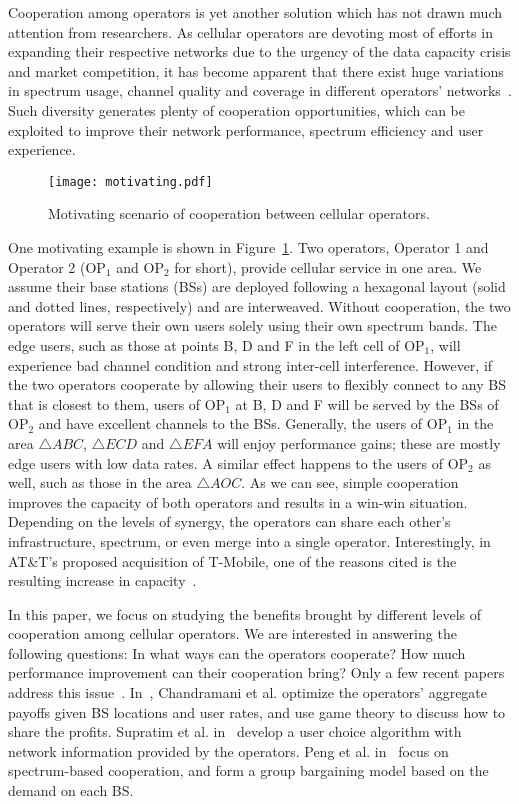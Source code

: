 \documentclass[conference]{IEEEtran}
\begin{document}
Cooperation among operators is yet another solution which has not drawn much attention from researchers. As cellular operators are devoting most of efforts in expanding their respective networks due to the urgency of the data capacity crisis and market competition, it has become apparent that there exist huge variations in spectrum usage, channel quality and coverage in different operators' networks~\cite{CoverageData}. Such diversity generates plenty of cooperation opportunities, which can be exploited to improve their network performance, spectrum efficiency and user experience.

\begin{figure}[htbp]
    \centerline{\texttt{[image: motivating.pdf]}}
    \caption{
       Motivating scenario of cooperation between cellular operators.
    }
    \label{fig:motivatingexample}
\vspace{-0.25in}
\end{figure}
One motivating example is shown in Figure~\ref{fig:motivatingexample}. Two operators, Operator 1 and Operator 2 (OP$_1$ and OP$_2$ for short), provide cellular service in one area. We assume their base stations (BSs) are deployed following a hexagonal layout (solid and dotted lines, respectively) and are interweaved. Without cooperation, the two operators will serve their own users solely using their own spectrum bands. The edge users, such as those at points B, D and F in the left cell of OP$_1$, will experience bad channel condition and strong inter-cell interference. However, if the two operators cooperate by allowing their users to flexibly connect to any BS that is closest to them, users of OP$_1$ at B, D and F will be served by the BSs of OP$_2$ and have excellent channels to the BSs. Generally, the users of OP$_1$ in the area $\triangle ABC$, $\triangle ECD$ and $\triangle EFA$ will enjoy performance gains; these are mostly edge users with low data rates. A similar effect happens to the users of OP$_2$ as well, such as those in the area $\triangle AOC$. As we can see, simple cooperation improves the capacity of both operators and results in a win-win situation. Depending on the levels of synergy, the operators can share each other's infrastructure, spectrum, or even merge into a single operator. Interestingly, in AT\&T's proposed acquisition of T-Mobile, one of the reasons cited is the resulting increase in capacity~\cite{FCCMerger11}.

In this paper, we focus on studying the benefits brought by different levels of cooperation among cellular operators. We are interested in answering the following questions: In what ways can the operators cooperate? How much performance improvement can their cooperation bring? Only a few recent papers address this issue~\cite{Singh@TON11}\cite{Supratim@MOBICOM11}\cite{Peng@WC10}. In~\cite{Singh@TON11}, Chandramani et al. optimize the operators' aggregate payoffs given BS locations and user rates, and use game theory to discuss how to share the profits. Supratim et al. in~\cite{Supratim@MOBICOM11} develop a user choice algorithm with network information provided by the operators. Peng et al. in~\cite{Peng@WC10} focus on spectrum-based cooperation, and form a group bargaining model based on the demand on each BS.
\end{document}
